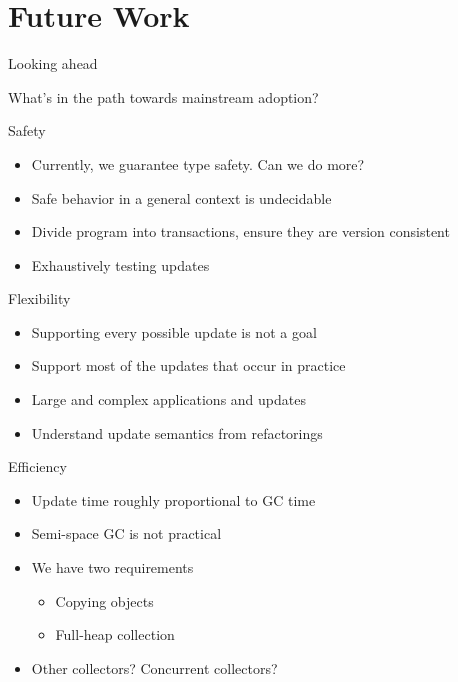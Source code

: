 \section{Future Work}
\ShowTOC
\begin{frame}{Looking ahead}%
\begin{center}
\begin{Huge}
What's in the path towards mainstream adoption?
\end{Huge}
\end{center}
\end{frame}

\begin{frame}{Safety}%
\begin{itemize}
\item Currently, we guarantee type safety. Can we do more?
\item Safe behavior in a general context is undecidable \cite{Gupta94}
\item Divide program into transactions, ensure they are version consistent
\cite{neamtiu08context}
\item Exhaustively testing updates
\end{itemize}
\end{frame}

\begin{frame}{Flexibility}%
\begin{itemize}
\item Supporting every possible update is not a goal
\item Support most of the updates that occur in practice
\item Large and complex applications and updates
\item Understand update semantics from refactorings
\end{itemize}
\end{frame}

\begin{frame}{Efficiency}%
\begin{itemize}
\item Update time roughly proportional to GC time
\item Semi-space GC is not practical
\item We have two requirements
  \begin{itemize}
  \item Copying objects
  \item Full-heap collection
  \end{itemize}
\item Other collectors? Concurrent collectors?
\end{itemize}
\end{frame}

